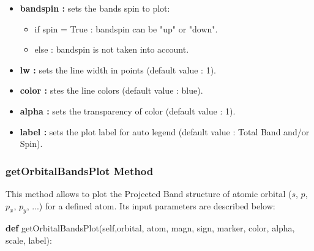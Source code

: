 \documentclass[11pt]{article}
\providecommand{\tightlist}{%
      \setlength{\itemsep}{0pt}\setlength{\parskip}{0pt}}
\newenvironment{Shaded}{}{}
\newcommand{\KeywordTok}[1]{\textcolor[rgb]{0.00,0.44,0.13}{\textbf{{#1}}}}
\newcommand{\NormalTok}[1]{{#1}}
\newcommand{\VariableTok}[1]{\textcolor[rgb]{0.10,0.09,0.49}{{#1}}}
\begin{document}
\begin{itemize}
\tightlist
\item
  \textbf{bandspin :} sets the bands spin to plot:

  \begin{itemize}
  \tightlist
  \item
    if spin = True : bandspin can be "up" or "down".
  \item
    else : bandspin is not taken into account.
  \end{itemize}
\item
  \textbf{lw :} sets the line width in points (default value : 1).
\item
  \textbf{color :} stes the line colors (default value : blue).
\item
  \textbf{alpha :} sets the transparency of color (default value : 1).
\item
  \textbf{label :} sets the plot label for auto legend (default value :
  Total Band and/or Spin).
\end{itemize}

\subsubsection{getOrbitalBandsPlot
Method}\label{getorbitalbandsplot-method}

This method allows to plot the Projected Band structure of atomic
orbital (\(s\), \(p\), \(p_x\), \(p_y\), ...) for a defined atom. Its
input parameters are described below:

\begin{Shaded}
\begin{Highlighting}[]
\KeywordTok{def} \NormalTok{getOrbitalBandsPlot(}\VariableTok{self}\NormalTok{,orbital, atom, magn, sign, marker, color, alpha, scale, label):}
\end{Highlighting}
\end{Shaded}
\end{document}
